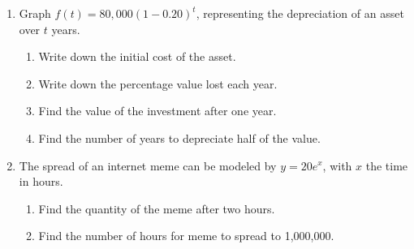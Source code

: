 \documentclass[12pt, twoside]{article}
\begin{document}
\begin{enumerate}
\item Graph $\displaystyle f(t)=80,000 \left( 1-0.20 \right)^t$, representing the depreciation of an asset over $t$ years.
\begin{multicols}{2}
    \begin{enumerate}[itemsep=1.2cm]
        \item Write down the initial cost of the asset.
        \item Write down the percentage value lost each year.
        \item Find the value of the investment after one year.\vspace{1cm}
        \item Find the number of years to depreciate half of the value.
    \end{enumerate}
    \begin{center}
    \end{center}
    \end{multicols}

\newpage
\item The spread of an internet meme can be modeled by $\displaystyle y= 20 e^x$, with $x$ the time in hours. 
\begin{enumerate}[itemsep=1cm]
    \item Find the quantity of the meme after two hours.
    \item Find the number of hours for meme to spread to 1,000,000.
\end{enumerate} \vspace{2cm}


\end{enumerate}
\end{document}
